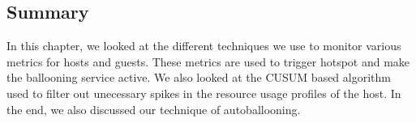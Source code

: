 \begin{enumerate}
\subsection*{Summary}
In this chapter, we looked at the different techniques we use to monitor various metrics for hosts and guests. These metrics are used to trigger hotspot and make the ballooning service active. We also looked at the CUSUM based algorithm used to filter out unecessary spikes in the resource usage profiles of the host. In the end, we also discussed our technique of autoballooning.
\end{enumerate}

